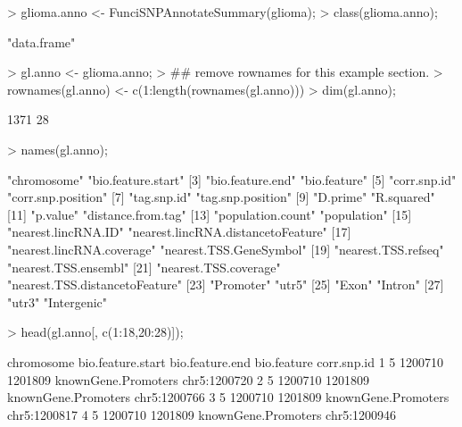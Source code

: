 \documentclass[12pt,fullpage]{article}
\begin{document}
\begin{Schunk}
\begin{Sinput}
> glioma.anno <- FunciSNPAnnotateSummary(glioma);
> class(glioma.anno);
\end{Sinput}
\begin{Soutput}
[1] "data.frame"
\end{Soutput}
\begin{Sinput}
> gl.anno <- glioma.anno;
> ## remove rownames for this example section.
> rownames(gl.anno) <- c(1:length(rownames(gl.anno)))
> dim(gl.anno);
\end{Sinput}
\begin{Soutput}
[1] 1371   28
\end{Soutput}
\begin{Sinput}
> names(gl.anno);
\end{Sinput}
\begin{Soutput}
 [1] "chromosome"                        "bio.feature.start"                
 [3] "bio.feature.end"                   "bio.feature"                      
 [5] "corr.snp.id"                       "corr.snp.position"                
 [7] "tag.snp.id"                        "tag.snp.position"                 
 [9] "D.prime"                           "R.squared"                        
[11] "p.value"                           "distance.from.tag"                
[13] "population.count"                  "population"                       
[15] "nearest.lincRNA.ID"                "nearest.lincRNA.distancetoFeature"
[17] "nearest.lincRNA.coverage"          "nearest.TSS.GeneSymbol"           
[19] "nearest.TSS.refseq"                "nearest.TSS.ensembl"              
[21] "nearest.TSS.coverage"              "nearest.TSS.distancetoFeature"    
[23] "Promoter"                          "utr5"                             
[25] "Exon"                              "Intron"                           
[27] "utr3"                              "Intergenic"                       
\end{Soutput}
\begin{Sinput}
> head(gl.anno[, c(1:18,20:28)]);
\end{Sinput}
\begin{Soutput}
  chromosome bio.feature.start bio.feature.end         bio.feature  corr.snp.id
1          5           1200710         1201809 knownGene.Promoters chr5:1200720
2          5           1200710         1201809 knownGene.Promoters chr5:1200766
3          5           1200710         1201809 knownGene.Promoters chr5:1200817
4          5           1200710         1201809 knownGene.Promoters chr5:1200946

\end{Soutput}
\end{Schunk}
\end{document}
